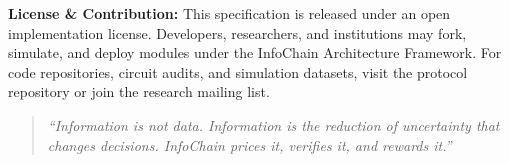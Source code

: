 \documentclass[11pt,a4paper]{article}
\begin{document}
\vspace{1em}
\noindent \textbf{License \& Contribution:} This specification is released under an open implementation license. Developers, researchers, and institutions may fork, simulate, and deploy modules under the InfoChain Architecture Framework. For code repositories, circuit audits, and simulation datasets, visit the protocol repository or join the research mailing list.

\begin{quote}
\textit{``Information is not data. Information is the reduction of uncertainty that changes decisions. InfoChain prices it, verifies it, and rewards it.''}
\end{quote}
\end{document}
